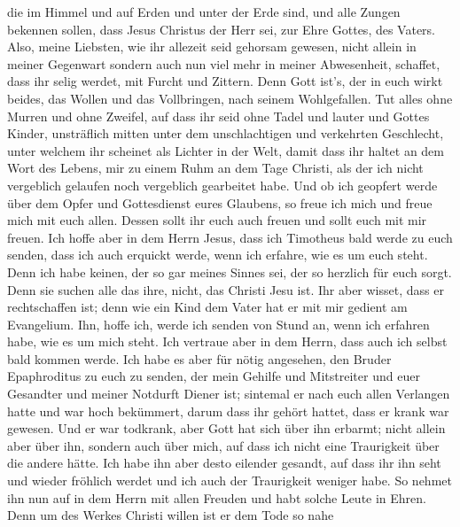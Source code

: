 die im Himmel und auf Erden und unter der Erde sind,  und
alle Zungen bekennen sollen, dass Jesus Christus der Herr sei, zur Ehre
Gottes, des Vaters.  Also, meine Liebsten, wie ihr allezeit
seid gehorsam gewesen, nicht allein in meiner Gegenwart sondern auch nun
viel mehr in meiner Abwesenheit, schaffet, dass ihr selig werdet, mit
Furcht und Zittern.  Denn Gott ist's, der in euch wirkt
beides, das Wollen und das Vollbringen, nach seinem Wohlgefallen.
 Tut alles ohne Murren und ohne Zweifel,  auf
dass ihr seid ohne Tadel und lauter und Gottes Kinder, unsträflich
mitten unter dem unschlachtigen und verkehrten Geschlecht, unter welchem
ihr scheinet als Lichter in der Welt,  damit dass ihr
haltet an dem Wort des Lebens, mir zu einem Ruhm an dem Tage Christi,
als der ich nicht vergeblich gelaufen noch vergeblich gearbeitet habe.
 Und ob ich geopfert werde über dem Opfer und Gottesdienst
eures Glaubens, so freue ich mich und freue mich mit euch allen.
 Dessen sollt ihr euch auch freuen und sollt euch mit mir
freuen.  Ich hoffe aber in dem Herrn Jesus, dass ich
Timotheus bald werde zu euch senden, dass ich auch erquickt werde, wenn
ich erfahre, wie es um euch steht.  Denn ich habe keinen,
der so gar meines Sinnes sei, der so herzlich für euch sorgt.
 Denn sie suchen alle das ihre, nicht, das Christi Jesu
ist.  Ihr aber wisset, dass er rechtschaffen ist; denn wie
ein Kind dem Vater hat er mit mir gedient am Evangelium. 
Ihn, hoffe ich, werde ich senden von Stund an, wenn ich erfahren habe,
wie es um mich steht.  Ich vertraue aber in dem Herrn, dass
auch ich selbst bald kommen werde.  Ich habe es aber für
nötig angesehen, den Bruder Epaphroditus zu euch zu senden, der mein
Gehilfe und Mitstreiter und euer Gesandter und meiner Notdurft Diener
ist;  sintemal er nach euch allen Verlangen hatte und war
hoch bekümmert, darum dass ihr gehört hattet, dass er krank war gewesen.
 Und er war todkrank, aber Gott hat sich über ihn erbarmt;
nicht allein aber über ihn, sondern auch über mich, auf dass ich nicht
eine Traurigkeit über die andere hätte.  Ich habe ihn aber
desto eilender gesandt, auf dass ihr ihn seht und wieder fröhlich werdet
und ich auch der Traurigkeit weniger habe.  So nehmet ihn
nun auf in dem Herrn mit allen Freuden und habt solche Leute in Ehren.
 Denn um des Werkes Christi willen ist er dem Tode so nahe
